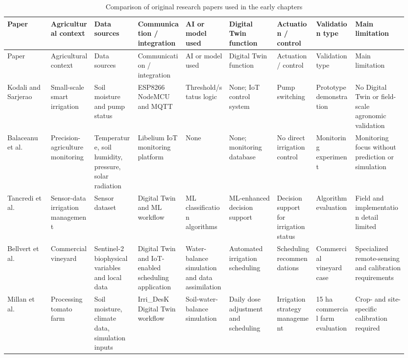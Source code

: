 \begin{landscape}
\begin{scriptsize}
\setlength{\tabcolsep}{2pt}
\renewcommand{\arraystretch}{1.15}
\begin{longtable}{@{}p{0.10\linewidth}p{0.105\linewidth}p{0.105\linewidth}p{0.115\linewidth}p{0.10\linewidth}p{0.115\linewidth}p{0.095\linewidth}p{0.095\linewidth}p{0.12\linewidth}@{}}
\caption{Comparison of original research papers used in the early chapters}
\label{tab:original-research-comparison}\\
\toprule
Paper & Agricultural context & Data sources & Communication / integration & AI or model used & Digital Twin function & Actuation / control & Validation type & Main limitation \\
\midrule
\endfirsthead
\toprule
Paper & Agricultural context & Data sources & Communication / integration & AI or model used & Digital Twin function & Actuation / control & Validation type & Main limitation \\
\midrule
\endhead
Kodali and Sarjerao \cite{kodali2017mqttirrigation} & Small-scale smart irrigation & Soil moisture and pump status & ESP8266 NodeMCU and MQTT & Threshold/status logic & None; IoT control system & Pump switching & Prototype demonstration & No Digital Twin or field-scale agronomic validation \\
Balaceanu et al. \cite{balaceanu2019libelium} & Precision-agriculture monitoring & Temperature, soil humidity, pressure, solar radiation & Libelium IoT monitoring platform & None & None; monitoring database & No direct irrigation control & Monitoring experiment & Monitoring focus without prediction or simulation \\
Tancredi et al. \cite{tancredi2025irrigationdt} & Sensor-data irrigation management & Sensor dataset & Digital Twin and ML workflow & ML classification algorithms & ML-enhanced decision support & Decision support for irrigation status & Algorithm evaluation & Field and implementation detail limited \\
Bellvert et al. \cite{bellvert2023vineyarddt} & Commercial vineyard & Sentinel-2 biophysical variables and local data & Digital Twin and IoT-enabled scheduling application & Water-balance simulation and data assimilation & Automated irrigation scheduling & Scheduling recommendations & Commercial vineyard case & Specialized remote-sensing and calibration requirements \\
Millan et al. \cite{millan2025tomatodt} & Processing tomato farm & Soil moisture, climate data, simulation inputs & Irri\_DesK Digital Twin workflow & Soil-water-balance simulation & Daily dose adjustment and scheduling & Irrigation strategy management & 15 ha commercial farm evaluation & Crop- and site-specific calibration required \\

\end{longtable}
\end{scriptsize}
\end{landscape}
